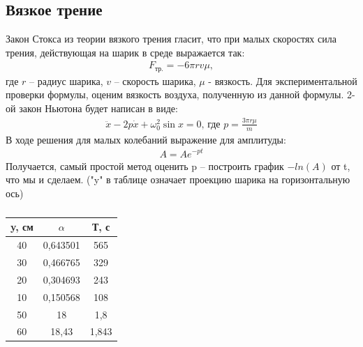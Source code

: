 \documentclass[a4paper, 10pt]{article}%
\begin{document}
\subsection*{Вязкое трение}
Закон Стокса из теории вязкого трения гласит, что при малых скоростях сила трения, действующая на шарик в среде выражается так:
\begin{equation}
\begin{aligned}
F_{\text{тр.}}=-6\pi rv\mu,
\end{aligned}
\end{equation}
где $r$ -- радиус шарика, $v$ -- скорость шарика, $\mu$ - вязкость.
Для экспериментальной проверки формулы, оценим вязкость воздуха, полученную из данной формулы.
2-ой закон Ньютона будет написан в виде:
\begin{equation}
\begin{aligned}
\ddot{x}-2p\dot{x}+\omega_{0}^2\sin x=0\text{,  где  }
p=\frac{3\pi r\mu}{m}
\end{aligned}
\end{equation}
В ходе решения для малых колебаний выражение для амплитуды:
\begin{equation}
\begin{aligned}
A=Ae^{-pt}
\end{aligned}
\end{equation}
Получается, самый простой метод оценить p -- построить график $-ln(A)$ от t, что мы и сделаем. ("y" в таблице означает проекцию шарика на горизонтальную ось)
\begin{table}[h]
\centering
\caption{}
\label{my-label}
\begin{tabular}{|c|c|c|}
\hline
\rowcolor[HTML]{9B9B9B} 
y, см & $\alpha$ & Т, с  \\ \hline
40    & 0,643501 & 565   \\ \hline
30    & 0,466765 & 329   \\ \hline
20    & 0,304693 & 243   \\ \hline
10    & 0,150568 & 108   \\ \hline
50    & 18       & 1,8   \\ \hline
60    & 18,43    & 1,843 \\ \hline
\end{tabular}
\end{table}
\end{document}
